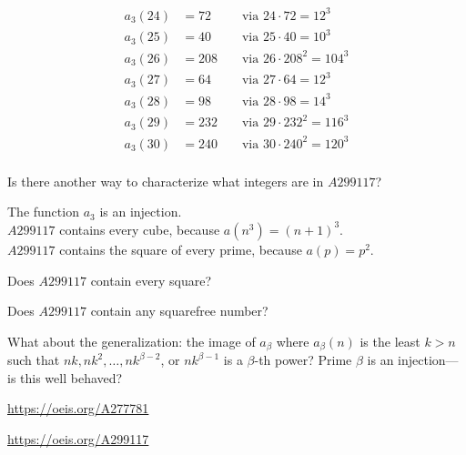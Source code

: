 \documentclass{article}
\begin{document}
\begin{multicols}{3}
\begin{alignat*}{2}
      a_3(24) &= 72  &&\text{ via } 24 \cdot 72    = 12^3 \\
      a_3(25) &= 40  &&\text{ via } 25 \cdot 40    = 10^3 \\
      a_3(26) &= 208 &&\text{ via } 26 \cdot 208^2 = 104^3 \\
      a_3(27) &= 64  &&\text{ via } 27 \cdot 64    = 12^3 \\
      a_3(28) &= 98  &&\text{ via } 28 \cdot 98    = 14^3 \\
      a_3(29) &= 232 &&\text{ via } 29 \cdot 232^2 = 116^3 \\
      a_3(30) &= 240 &&\text{ via } 30 \cdot 240^2 = 120^3 \\
    \end{alignat*}
  \end{multicols}
\begin{question}
  Is there another way to characterize what integers are in $A299117$?
\end{question}

\begin{note}
  The function $a_3$ is an injection.\\
  $A299117$ contains every cube, because $a(n^3) = (n + 1)^3$.\\
  $A299117$ contains the square of every prime, because $a(p) = p^2$.
\end{note}

\begin{related}
  \item Does $A299117$ contain every square?
  \item Does $A299117$ contain any squarefree number?
  \item What about the generalization: the image of $a_\beta$ where $a_\beta(n)$
    is the least $k > n$ such that $nk, nk^2, \hdots, nk^{\beta-2}$, or $nk^{\beta-1}$
    is a $\beta$-th power? Prime $\beta$ is an injection---is this well behaved?
\end{related}

\begin{references}
  \item \url{https://oeis.org/A277781}
  \item \url{https://oeis.org/A299117}
\end{references}
\end{document}
